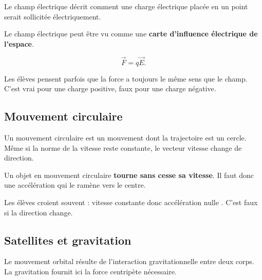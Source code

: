 \documentclass[11pt,a4paper]{article}
\begin{document}
\begin{sens}
Le champ électrique décrit comment une charge électrique placée en un point serait sollicitée électriquement.
\end{sens}

\begin{imagem}
Le champ électrique peut être vu comme une \textbf{carte d'influence électrique de l'espace}.
\end{imagem}

\begin{bilan}
\[
\vec F = q\vec E.
\]
\end{bilan}

\begin{fausseintuition}
Les élèves pensent parfois que la force a toujours le même sens que le champ.
C'est vrai pour une charge positive, faux pour une charge négative.
\end{fausseintuition}

\subsection{Mouvement circulaire}

\begin{sens}
Un mouvement circulaire est un mouvement dont la trajectoire est un cercle.
Même si la norme de la vitesse reste constante, le vecteur vitesse change de direction.
\end{sens}

\begin{imagem}
Un objet en mouvement circulaire \textbf{tourne sans cesse sa vitesse}.
Il faut donc une accélération qui le ramène vers le centre.
\end{imagem}

\begin{fausseintuition}
Les élèves croient souvent :
\og vitesse constante donc accélération nulle \fg.
C'est faux si la direction change.
\end{fausseintuition}

\subsection{Satellites et gravitation}

\begin{sens}
Le mouvement orbital résulte de l'interaction gravitationnelle entre deux corps.
La gravitation fournit ici la force centripète nécessaire.
\end{sens}
\end{document}
